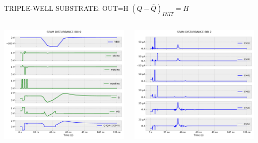 
\begin{frame}{TRIPLE-WELL SUBSTRATE: OUT=H}
	\vspace{5mm}
	$(Q-\bar{Q})_{INIT}=H$
	\vspace{5mm}
	\begin{columns}
		\begin{column}{0.5\textwidth}
			\centering
			\includegraphics[width=\textwidth]{./figures/SRAMBBI0_zHIGH_TW-300.pdf}
		\end{column}
		\begin{column}{0.5\textwidth}
			\centering
			\includegraphics[width=\textwidth]{./figures/SRAMBBI2_zHIGH_TW-300.pdf}
		\end{column}
	\end{columns}
\end{frame}
